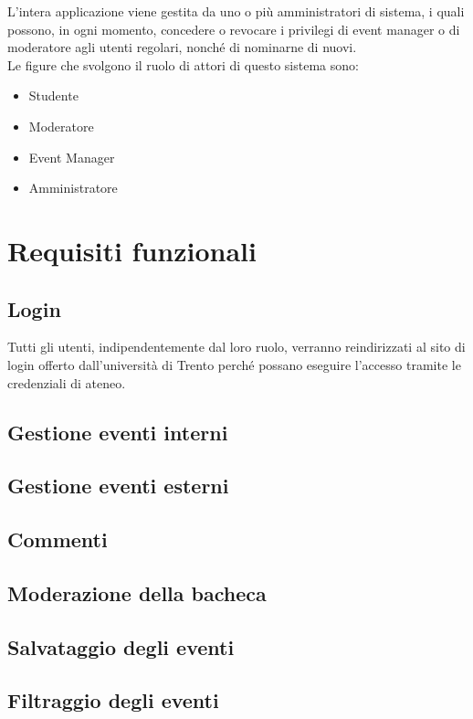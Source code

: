 \documentclass{article}
\begin{document}
L’intera applicazione viene gestita da uno o più amministratori di sistema, i quali possono, in ogni momento, concedere o revocare i privilegi di event manager o di moderatore agli utenti regolari, nonché di nominarne di nuovi.\\
Le figure che svolgono il ruolo di attori di questo sistema sono:
%
\begin{itemize}
   \item Studente
   \item Moderatore
   \item Event Manager
   \item Amministratore
\end{itemize}
%
\section*{Requisiti funzionali}
%
   \subsection{Login}
   Tutti gli utenti, indipendentemente dal loro ruolo, verranno reindirizzati al sito di login offerto dall’università di Trento perché possano eseguire l’accesso tramite le credenziali di ateneo.
   \subsection{Gestione eventi interni}
   \subsection{Gestione eventi esterni}
   \subsection{Commenti}
   \subsection{Moderazione della bacheca}
   \subsection{Salvataggio degli eventi}
   \subsection{Filtraggio degli eventi}
%
\end{document}
